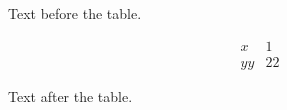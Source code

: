 \documentclass[12pt]{article}
\begin{document}
Text before the table.

\[\begin{array}{lr}x & 1\\yy & 22\end{array}\]

Text after the table.
\end{document}
